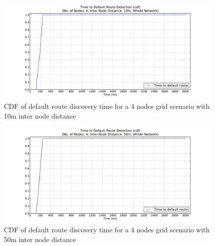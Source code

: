 \begin{figure}[htbp]
  \begin{center}
  \hspace{-20pt}
    \leavevmode
      \includegraphics[width=\textwidth]
      {Pics/results/4/MRHOF/grid/dist10_montecarlo_cdf_hist.pdf}
   \caption{CDF of default route discovery time for a 4 nodes grid scenario with 10m inter node distance}
   \label{fig:4_MRHOF_grid_10_cdf}
  \end{center}
  \vspace{-10pt}
\end{figure}

\begin{figure}[htbp]
  \begin{center}
  \hspace{-20pt}
    \leavevmode
      \includegraphics[width=\textwidth]
      {Pics/results/4/MRHOF/grid/dist50_montecarlo_cdf_hist.pdf}
   \caption{CDF of default route discovery time for a 4 nodes grid scenario with 50m inter node distance}
   \label{fig:4_MRHOF_grid_50_cdf}
  \end{center}
  \vspace{-10pt}
\end{figure}

